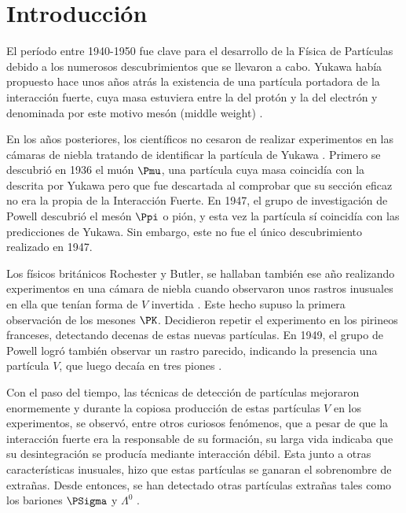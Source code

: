 \renewcommand{\listtablename}{Índice de tablas}
\renewcommand{\tablename}{Tabla}

\chapter{Introducción}\label{cap:intro}
El período entre 1940-1950 fue clave para el desarrollo de la Física de Partículas debido a los numerosos descubrimientos que se llevaron a cabo. Yukawa había propuesto hace unos años atrás la existencia de una partícula portadora de la interacción fuerte, cuya masa estuviera entre la del protón y la del electrón y denominada por este motivo mesón (middle weight) \cite{Griffiths2008}.
 
En los años posteriores, los científicos no cesaron de realizar experimentos en las cámaras de niebla tratando de identificar la partícula de Yukawa \cite{Lattes}. Primero se descubrió en 1936 el muón $\Pmu$, una partícula cuya masa coincidía con la descrita por Yukawa pero que fue descartada al comprobar que su sección eficaz no era la propia de la Interacción Fuerte. En 1947, el grupo de investigación de Powell descubrió el mesón $\Ppi$ o pión, y esta vez la partícula sí coincidía con las predicciones de Yukawa. Sin embargo, este no fue el único descubrimiento realizado en 1947.

Los físicos británicos Rochester y Butler, se hallaban también ese año realizando experimentos en una cámara de niebla cuando observaron unos rastros inusuales en ella que tenían forma de $V$ invertida \cite{Nature1}. Este hecho supuso la primera observación de los mesones $\PK$. Decidieron repetir el experimento en los pirineos franceses, detectando decenas de estas nuevas partículas. En 1949, el grupo de Powell logró también observar un rastro parecido, indicando la presencia una partícula $V$, que luego decaía en tres piones \cite{Powell}. 

Con el paso del tiempo, las técnicas de detección de partículas mejoraron enormemente y durante la copiosa producción de estas partículas $V$ en los experimentos, se observó, entre otros curiosos fenómenos, que a pesar de que la interacción fuerte era la responsable de su formación, su larga vida indicaba que su desintegración se producía mediante interacción débil. Esta junto a otras características inusuales, hizo que estas partículas se ganaran el sobrenombre de extrañas. Desde entonces, se han detectado otras partículas extrañas tales como los bariones $\PSigma$ y $\Lambda^0$ \cite{Bardeen2012}.

